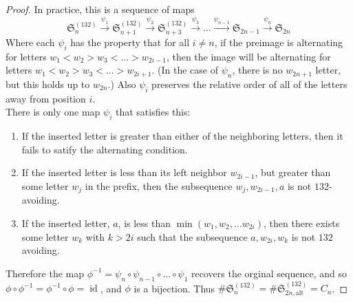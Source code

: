 \documentclass{article}
\begin{document}
\begin{proof}
  In practice, this is a sequence of maps \[
    \mathfrak S_n^{(132)} \xrightarrow{\psi_1}
    \mathfrak S_{n+1}^{(132)} \xrightarrow{\psi_2}
    \mathfrak S_{n+3}^{(132)} \xrightarrow{\psi_3}
    \hdots \xrightarrow{\psi_{n-1}}
    \mathfrak S_{2n-1} \xrightarrow{\psi_n}
    \mathfrak S_{2n}
  \]
  Where each $\psi_i$ has the property that for all $i \neq n$, if the preimage
  is alternating for letters $w_1 < w_2 > w_3 < \hdots > w_{2i-1}$, then the
  image will be alternating for letters $w_1 < w_2 > w_3 < \hdots > w_{2i+1}$.
  (In the case of $\psi_n$,  there is no $w_{2n + 1}$ letter, but this holds up
  to $w_{2n}$.)
  Also $\psi_i$ preserves the relative order of all of the letters
  away from position $i$.
  \\
  There is only one map $\psi_i$ that satisfies this: \begin{enumerate}
    \item If the inserted letter is greater than either of the neighboring
    letters, then it fails to satify the
    alternating condition.
    \item If the inserted letter is less than its left neighbor $w_{2i-1}$, but
    greater than some letter $w_j$ in the prefix, then the subsequence
    $w_j, w_{2i-1}, a$ is not $132$-avoiding.
    \item If the inserted letter, $a$, is less than
    $\min(w_1, w_2, \hdots w_{2i})$, then there exists some letter $w_k$ with
    $k > 2i$ such that the subsequence $a, w_{2i}, w_k$ is not $132$ avoiding.
  \end{enumerate}
  Therefore the map
  $\phi^{-1} = \psi_n \circ \psi_{n - 1} \circ \hdots \circ \psi_1$ recovers the
  orginal sequence, and so
  $\phi \circ \phi^{-1} = \phi^{-1} \circ \phi = \operatorname{id}$, and
  $\phi$ is a bijection.
  Thus $\#\mathfrak S_{n}^{(132)} = \#\mathfrak S_{2n,\text{alt}}^{(132)} = C_n$.
\end{proof}
\end{document}
